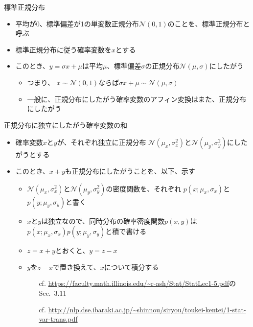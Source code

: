 \documentclass[aspectratio=169,unicode,dvipdfmx,14pt]{beamer}
\begin{document}
\begin{frame}{標準正規分布}
\begin{itemize}
\item 平均が0、標準偏差が1の単変数正規分布$\mathcal{N}(0,1)$のことを、標準正規分布と呼ぶ
\item 標準正規分布に従う確率変数を$x$とする
\item このとき、$y=\sigma x+\mu$は平均$\mu$、標準偏差$\sigma$の正規分布$\mathcal{N}(\mu,\sigma)$にしたがう
\begin{itemize}
\item つまり、 $x\sim\mathcal{N}(0,1)$ならば$\sigma x + \mu\sim\mathcal{N}(\mu,\sigma)$
\item 一般に、正規分布にしたがう確率変数のアフィン変換はまた、正規分布にしたがう
\end{itemize}
\end{itemize}
\end{frame}

\begin{frame}{正規分布に独立にしたがう確率変数の和}
\begin{itemize}
\item 確率変数$x$と$y$が、それぞれ独立に正規分布
$\mathcal{N}(\mu_x,\sigma_x^2)$と$\mathcal{N}(\mu_y,\sigma_y^2)$にしたがうとする
\item このとき、$x+y$も正規分布にしたがうことを、以下、示す
\begin{itemize}
\item $\mathcal{N}(\mu_x,\sigma_x^2)$と$\mathcal{N}(\mu_y,\sigma_y^2)$の密度関数を、それぞれ
$p(x;\mu_x,\sigma_x)$と$p(y;\mu_y,\sigma_y)$と書く
\item $x$と$y$は独立なので、同時分布の確率密度関数$p(x,y)$は$p(x;\mu_x,\sigma_x)p(y;\mu_y,\sigma_y)$と積で書ける
\item $z=x+y$とおくと、$y=z-x$
\item $y$を$z-x$で置き換えて、$x$について積分する
\begin{itemize}
\item[cf.] {\tiny \href{https://faculty.math.illinois.edu/\~r-ash/Stat/StatLec1-5.pdf}{\url{https://faculty.math.illinois.edu/~r-ash/Stat/StatLec1-5.pdf}}のSec.~3.11}
\item[cf.] {\tiny \href{http://nlp.dse.ibaraki.ac.jp/\~shinnou/siryou/toukei-kentei/1-stat-var-trans.pdf}{\url{http://nlp.dse.ibaraki.ac.jp/~shinnou/siryou/toukei-kentei/1-stat-var-trans.pdf}}}
\end{itemize}
\end{itemize}
\end{itemize}
\end{frame}
\end{document}
